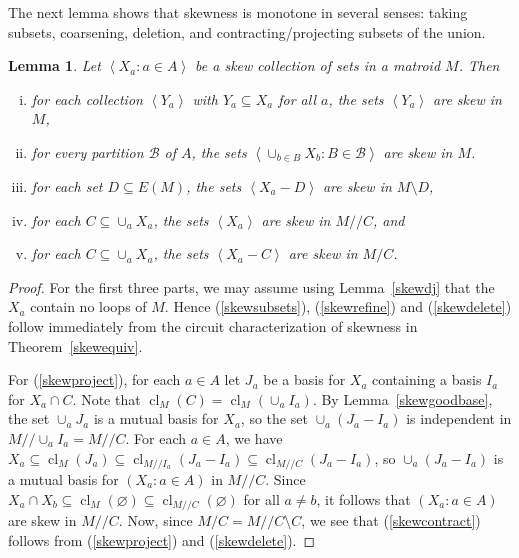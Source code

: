 \documentclass{amsart}
\theoremstyle{plain}
\newtheorem{lemma}[theorem]{Lemma}
\theoremstyle{definition}
\newcommand{\cB}{\mathcal{B}}
\newcommand{\dcon}{/ \!\! /}
\DeclareMathOperator{\cl}{cl}
\newcommand{\del}{\!\setminus\!}
\newcommand{\con}{/}
\newcommand{\ab}[1]{\left\langle#1\right\rangle}
\newcommand{\es}{\varnothing}
\renewcommand{\ss}{\subseteq}
\begin{document}
The next lemma shows that skewness is monotone in several senses: 
taking subsets, coarsening, deletion, and contracting/projecting subsets of the union. 

\begin{lemma}\label{skewmono}
  Let $\ab{X_a : a \in A}$ be a skew collection of sets in a matroid $M$. 
  Then 
  \begin{enumerate}[(i)]
    \item\label{skewsubsets} for each collection $\ab{Y_a}$ with $Y_a \ss X_a$ for all 
    $a$, the sets $\ab{Y_a}$ are skew in $M$,
    \item\label{skewrefine} for every partition $\cB$ of $A$, the sets 
      $\ab{\cup_{b \in B} X_b : B \in \cB}$ are skew in $M$. 
    \item\label{skewdelete} for each set $D \ss E(M)$, 
      the sets $\ab{X_a - D}$ are skew in $M \del D$, 
    \item\label{skewproject} for each $C \ss \cup_a X_a$, 
      the sets $\ab{X_a}$ are skew in $M \dcon C$, and
    \item\label{skewcontract} for each $C \ss \cup_a X_a$,
    the sets $\ab{X_a - C}$ are skew in $M \con C$.
  \end{enumerate}
\end{lemma}
\begin{proof}
  For the first three parts, we may assume using Lemma~\ref{skewdj} that the $X_a$ 
  contain no loops of $M$. Hence (\ref{skewsubsets}), (\ref{skewrefine}) and (\ref{skewdelete}) 
  follow immediately from the circuit characterization of
  skewness in Theorem~\ref{skewequiv}. 

  For (\ref{skewproject}), for each $a \in A$ let $J_a$ be a basis for $X_a$ 
  containing a basis $I_a$ for $X_a \cap C$. Note that $\cl_M(C) = \cl_M(\cup_a I_a)$. 
  By Lemma~\ref{skewgoodbase}, the set $\cup_a J_a$ is a mutual basis for $X_a$, 
  so the set $\cup_a (J_a - I_a)$ is independent in $M \dcon \cup_a I_a = M \dcon C$. 
  For each $a \in A$, we have 
  $X_a \ss \cl_M(J_a) \ss \cl_{M \dcon I_a}(J_a - I_a) \ss \cl_{M \dcon C}(J_a - I_a)$, 
  so $\cup_a(J_a - I_a)$ is a mutual basis for $(X_a : a \in A)$ in $M \dcon C$. 
  Since $X_a \cap X_b \ss \cl_M(\es) \ss \cl_{M \dcon C} (\es)$ for all $a \ne b$, 
  it follows that $(X_a : a \in A)$ are skew in $M \dcon C$. 
  Now, since $M \con C = M \dcon C \del C$, we see that (\ref{skewcontract}) follows from (\ref{skewproject}) and (\ref{skewdelete}).
\end{proof}
\end{document}
